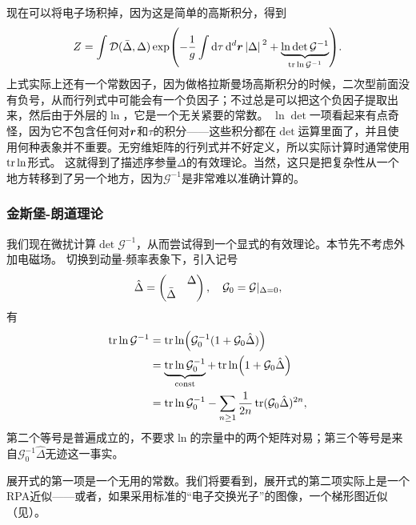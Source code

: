 \documentclass[hyperref, UTF8, a4paper]{ctexart}
\newcommand*{\const}{\mathrm{const}}
\newcommand*{\fd}[1]{\mathcal{D}{#1}}
\begin{document}
现在可以将电子场积掉，因为这是简单的高斯积分，得到
\begin{equation}
    Z = \int \fd(\bar{\Delta}, \Delta) \exp(- \frac{1}{g} \int \dd{\tau} \dd[d]{\vb*{r}} \abs*{\Delta}^2 + \underbrace{\ln \det \mathcal{G}^{-1}}_{\trace \ln \mathcal{G}^{-1}}).
    \label{eq:bcs-without-electron}
\end{equation}
上式实际上还有一个常数因子，因为做格拉斯曼场高斯积分的时候，二次型前面没有负号，从而行列式中可能会有一个负因子；不过总是可以把这个负因子提取出来，然后由于外层的$\ln$，它是一个无关紧要的常数。
$\ln \det$一项看起来有点奇怪，因为它不包含任何对$\vb*{r}$和$\tau$的积分——这些积分都在$\det$运算里面了，并且使用何种表象并不重要。无穷维矩阵的行列式并不好定义，所以实际计算时通常使用$\trace \ln$形式。
这就得到了描述序参量$\Delta$的有效理论。当然，这只是把复杂性从一个地方转移到了另一个地方，因为$\mathcal{G}^{-1}$是非常难以准确计算的。

\subsubsection{金斯堡-朗道理论}

我们现在微扰计算$\det \mathcal{G}^{-1}$，从而尝试得到一个显式的有效理论。本节先不考虑外加电磁场。
切换到动量-频率表象下，引入记号
\[
    \hat{\Delta} = \pmqty{ & \Delta \\ \bar{\Delta} & }, \quad \mathcal{G}_0 = \mathcal{G} |_{\Delta = 0},
\]
有
\[
    \begin{aligned}
        \trace \ln \mathcal{G}^{-1} &= \trace \ln (\mathcal{G}^{-1}_0 (1 + \mathcal{G}_0 \hat{\Delta})) \\
        &= \underbrace{\trace \ln \mathcal{G}^{-1}_0}_{\const} + \trace \ln (1 + \mathcal{G}_0 \hat{\Delta}) \\
        &= \trace \ln \mathcal{G}^{-1}_0 - \sum_{n \geq 1} \frac{1}{2n} \trace (\mathcal{G}_0 \hat{\Delta})^{2n} ,
    \end{aligned}
\]
第二个等号是普遍成立的，不要求$\ln$的宗量中的两个矩阵对易；第三个等号是来自$\mathcal{G}^{-1}_0 \hat{\Delta}$无迹这一事实。

展开式的第一项是一个无用的常数。我们将要看到，展开式的第二项实际上是一个RPA近似——或者，如果采用标准的“电子交换光子”的图像，一个梯形图近似（见）。
\end{document}
